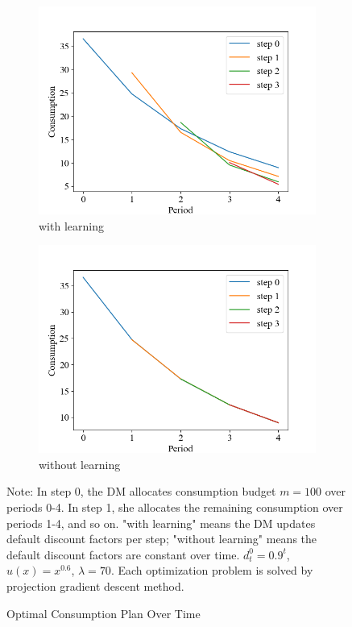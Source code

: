 \documentclass[
  12pt,
]{article}
\begin{document}
\begin{figure}[h]
    \centering
    \begin{subfigure}{0.49\textwidth}
        \centering
        \includegraphics[width=\linewidth]{figures/learning_c.png} 
        \caption{with learning}
    \end{subfigure}
    \hfill
    \begin{subfigure}{0.49\textwidth}
        \centering
        \includegraphics[width=\linewidth]{figures/no_learning_c.png}
        \caption{without learning}
    \end{subfigure}
    \caption{Optimal Consumption Plan Over Time}

  \vspace{8pt}
  \begin{minipage}{1.0\textwidth}
{\par\footnotesize Note: In step 0, the DM allocates consumption budget $m=100$ over periods 0-4. In step 1, she allocates the remaining consumption over periods 1-4, and so on. "with learning" means the DM updates default discount factors per step; "without learning" means the default discount factors are constant over time. $d_t^0=0.9^t$, $u(x)=x^{0.6}$, $\lambda=70$. Each optimization problem is solved by projection gradient descent method.}
\end{minipage}
    

\end{figure}
\end{document}
